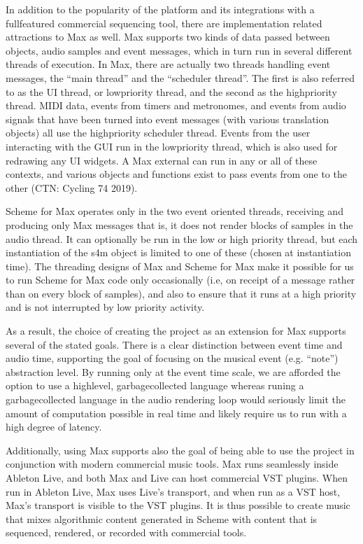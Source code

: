 \documentclass[letterpaper,10pt,english]{sphinxmanual}
\begin{document}
\sphinxAtStartPar
In addition to the popularity of the platform and its integrations with a full\sphinxhyphen{}featured commercial sequencing tool,
there are implementation related attractions to Max as well.
Max supports two kinds of data passed between objects, audio samples and event messages, which in turn run in several
different threads of execution.
In Max, there are actually two threads handling event messages, the “main thread” and the “scheduler thread”.
The first is also referred to as the UI thread, or low\sphinxhyphen{}priority thread, and the second as the high\sphinxhyphen{}priority thread.
MIDI data, events from timers and metronomes, and events from audio signals that have been turned into event messages
(with various translation objects) all use the high\sphinxhyphen{}priority scheduler thread.
Events from the user interacting with the GUI run in the low\sphinxhyphen{}priority thread, which is also used for redrawing any UI widgets.
A Max external can run in any or all of these contexts, and various objects and functions exist to pass events from one to the other
(CTN: Cycling 74 2019).

\sphinxAtStartPar
Scheme for Max operates only in the two event oriented threads, receiving and producing only Max messages \sphinxhyphen{}
that is, it does not render blocks of samples in the audio thread.
It can optionally be run in  the low or high priority thread, but each instantiation of the s4m object
is limited to one of these (chosen at instantiation time).
The threading designs of Max and Scheme for Max make it possible for us to run Scheme for Max code only occasionally
(i.e, on receipt of a message rather than on every block of samples), and also to ensure that it runs at a high priority
and is not interrupted by low priority activity.

\sphinxAtStartPar
As a result, the choice of creating the project as an extension for Max supports several of the stated goals.
There is a clear distinction between event time and audio time, supporting the goal of focusing on
the musical event (e.g. “note”) abstraction level.
By running only at the event time scale, we are afforded the option to use a high\sphinxhyphen{}level, garbage\sphinxhyphen{}collected language \sphinxhyphen{}
whereas runing a garbage\sphinxhyphen{}collected language in the audio rendering loop would seriously limit the amount of
computation possible in real time and likely require us to run with a high degree of latency.

\sphinxAtStartPar
Additionally, using Max supports also the goal of being able to use the project in conjunction with modern commercial music tools.
Max runs seamlessly inside Ableton Live, and both Max and Live can host commercial VST plugins.
When run in Ableton Live, Max uses Live’s transport, and when run as a VST host, Max’s transport is visible to the VST plugins.
It is thus possible to create music that mixes algorithmic content generated in Scheme with
content that is sequenced, rendered, or recorded with commercial tools.
\end{document}

